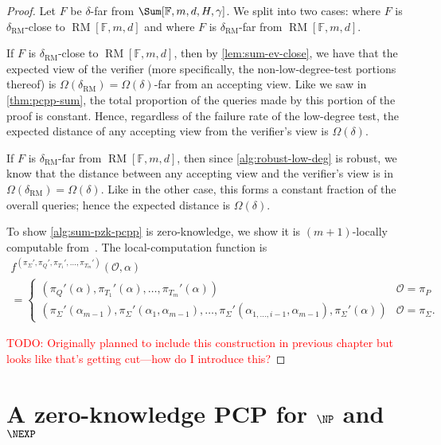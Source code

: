 \documentclass[english,12pt]{reedthesis}
\theoremstyle{plain}
\theoremstyle{definition}
\theoremstyle{remark}
\DeclareMathOperator{\RM}{RM}
\newcommand{\TODO}[1]{\textcolor{red}{TODO: #1}}
\begin{document}
\begin{proof}
  Let $F$ be $\delta$-far from $\Sum[\mathbb{F}, m, d, H, \gamma]$. We split into two
  cases: where $F$ is $\delta_{\RM}$-close to $\RM[\mathbb{F}, m, d]$ and where $F$
  is $\delta_{\RM}$-far from $\RM[\mathbb{F}, m, d]$.

  If $F$ is $\delta_{\RM}$-close to $\RM[\mathbb{F}, m, d]$, then by
  \cref{lem:sum-ev-close}, we have that the expected view of the verifier (more
  specifically, the non-low-degree-test portions thereof) is
  $\Omega(\delta_{\RM}) = \Omega(\delta)$-far from an accepting view. Like we saw in
  \cref{thm:pcpp-sum}, the total proportion of the queries made by this portion
  of the proof is constant. Hence, regardless of the failure rate of the
  low-degree test, the expected distance of any accepting view from the
  verifier's view is $\Omega(\delta)$.

  If $F$ is $\delta_{\RM}$-far from $\RM[\mathbb{F}, m, d]$, then since
  \cref{alg:robust-low-deg} is robust, we know that the distance between any
  accepting view and the verifier's view is in $\Omega(\delta_{\RM}) = \Omega(\delta)$. Like in the
  other case, this forms a constant fraction of the overall queries; hence the
  expected distance is $\Omega(\delta)$.

  To show \cref{alg:sum-pzk-pcpp} is zero-knowledge, we show it is
  $(m+1)$-locally computable from~\cite[Construction 8.4]{GOS24}. The
  local-computation function is
  \begin{multline}
    f^{(\pi_{\Sigma}',\pi_{Q}',\pi_{T_{1}}',\ldots,\pi_{T_{m}}')}(\mathcal{O}, \alpha) \\ =
    \begin{cases}
      (\pi_{Q}'(\alpha), \pi_{T_{1}}'(\alpha), \ldots, \pi_{T_{m}}'(\alpha)) & \mathcal{O} = \pi_{P} \\
      (\pi_{\Sigma}'(\alpha_{m-1}), \pi_{\Sigma}'(\alpha_{1},\alpha_{m-1}), \ldots, \pi_{\Sigma}'(\alpha_{1,\ldots,i-1},\alpha_{m-1}), \pi_{\Sigma}'(\alpha)) & \mathcal{O} = \pi_{\Sigma}.
    \end{cases}
  \end{multline}

  \TODO{Originally planned to include this construction in previous chapter but
    looks like that's getting cut---how do I introduce this?}
\end{proof}

\section{A zero-knowledge PCP for $\NP$ and $\NEXP$}\label{sec:pzkpcp-np-nexp}
\end{document}

